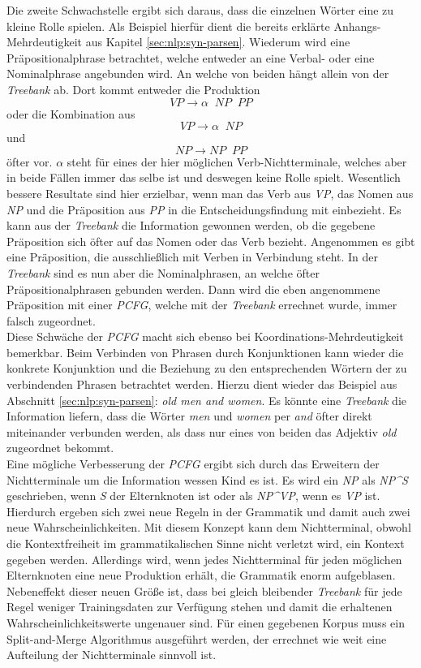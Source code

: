 Die zweite Schwachstelle ergibt sich daraus, dass die einzelnen Wörter eine zu kleine Rolle spielen. Als Beispiel hierfür dient die bereits erklärte Anhangs-Mehrdeutigkeit aus Kapitel \ref{sec:nlp:syn-parsen}. Wiederum wird eine Präpositionalphrase betrachtet, welche entweder an eine Verbal- oder eine Nominalphrase angebunden wird. An welche von beiden hängt allein von der \textit{Treebank} ab. Dort kommt entweder die Produktion \[ VP  \to  \alpha \;\;  NP \;\; PP \] oder die Kombination aus \[ VP  \to  \alpha \;\; NP \] und \[ NP  \to  NP \;\; PP \] öfter vor. \( \alpha \) steht für eines der hier möglichen Verb-Nichtterminale, welches aber in beide Fällen immer das selbe ist und deswegen keine Rolle spielt. Wesentlich bessere Resultate sind hier erzielbar, wenn man das Verb aus \textit{VP}, das Nomen aus \textit{NP} und die Präposition aus \textit{PP} in die Entscheidungsfindung mit einbezieht. Es kann aus der \textit{Treebank} die Information gewonnen werden, ob die gegebene Präposition sich öfter auf das Nomen oder das Verb bezieht. Angenommen es gibt eine Präposition, die ausschließlich mit Verben in Verbindung steht. In der \textit{Treebank} sind es nun aber die Nominalphrasen, an welche öfter Präpositionalphrasen gebunden werden. Dann wird die eben angenommene Präposition mit einer \textit{PCFG}, welche mit der \textit{Treebank} errechnet wurde, immer falsch zugeordnet. \\ Diese Schwäche der \textit{PCFG} macht sich ebenso bei Koordinations-Mehrdeutigkeit bemerkbar. Beim Verbinden von Phrasen durch Konjunktionen kann wieder die konkrete Konjunktion und die Beziehung zu den entsprechenden Wörtern der zu verbindenden Phrasen betrachtet werden. Hierzu dient wieder das Beispiel aus Abschnitt \ref{sec:nlp:syn-parsen}: \textit{old men and women}. Es könnte eine \textit{Treebank} die Information liefern, dass die Wörter \textit{men} und \textit{women} per \textit{and} öfter direkt miteinander verbunden werden, als dass nur eines von beiden das Adjektiv \textit{old} zugeordnet bekommt. \\
Eine mögliche Verbesserung der \textit{PCFG} ergibt sich durch das Erweitern der Nichtterminale um die Information wessen Kind es ist. Es wird ein \textit{NP} als \textit{NP\^{}S} geschrieben, wenn \textit{S} der Elternknoten ist oder als \textit{NP\^{}VP}, wenn es \textit{VP} ist. Hierdurch ergeben sich zwei neue Regeln in der Grammatik und damit auch zwei neue Wahrscheinlichkeiten. Mit diesem Konzept kann dem Nichtterminal, obwohl die Kontextfreiheit im grammatikalischen Sinne nicht verletzt wird, ein Kontext gegeben werden. Allerdings wird, wenn jedes Nichtterminal für jeden möglichen Elternknoten eine neue Produktion erhält, die Grammatik enorm aufgeblasen. Nebeneffekt dieser neuen Größe ist, dass bei gleich bleibender \textit{Treebank} für jede Regel weniger Trainingsdaten zur Verfügung stehen und damit die erhaltenen Wahrscheinlichkeitswerte ungenauer sind. Für einen gegebenen Korpus muss ein Split-and-Merge Algorithmus ausgeführt werden, der errechnet wie weit eine Aufteilung der Nichtterminale sinnvoll ist. \cite[Kapitel 12]{nlpGrundlagen} 

